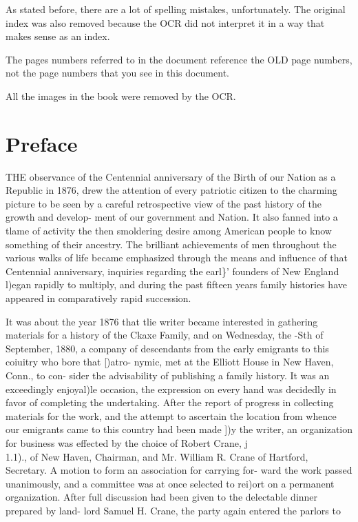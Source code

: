 \documentclass[oneside]{book}
\begin{document}
As stated before, there are a lot of spelling mistakes, unfortunately. The original index was also removed because the OCR did not interpret it in a way that makes sense as an index. 

The pages numbers referred to in the document reference the OLD page numbers, not the page numbers that you see in this document. 

All the images in the book were removed by the OCR. 


\section{Preface}

THE observance of the Centennial anniversary of the Birth of 
our Nation as a Republic in 1876, drew the attention of every 
patriotic citizen to the charming picture to be seen by a careful 
retrospective view of the past history of the growth and develop- 
ment of our government and Nation. It also fanned into a tlame 
of activity the then smoldering desire among American people 
to know something of their ancestry. The brilliant achievements 
of men throughout the various walks of life became emphasized 
through the means and influence of that Centennial anniversary, 
inquiries regarding the earl\}' founders of New England l)egan 
rapidly to multiply, and during the past fifteen years family 
histories have appeared in comparatively rapid succession. 

It was about the year 1876 that tlie writer became interested 
in gathering materials for a history of the Ckaxe Family, and 
on Wednesday, the -Sth of September, 1880, a company of descendants from the early emigrants to this coiuitry who bore that [)atro- 
nymic, met at the Elliott House in New Haven, Conn., to con- 
sider the advisability of publishing a family history. It was an 
exceedingly enjoyal)le occasion, the expression on every hand was 
decidedly in favor of completing the undertaking. After the 
report of progress in collecting materials for the work, and the 
attempt to ascertain the location from whence our emigrants came 
to this country had been made ])y the writer, an organization for 
business was effected by the choice of Robert Crane, j\\1.1)., of 
New Haven, Chairman, and Mr. William R. Crane of Hartford, 
Secretary. A motion to form an association for carrying for- 
ward the work passed unanimously, and a committee was at once 
selected to rei)ort on a permanent organization. After full discussion had been given to the delectable dinner prepared by land- 
lord Samuel H. Crane, the party again entered the parlors to 
\end{document}
